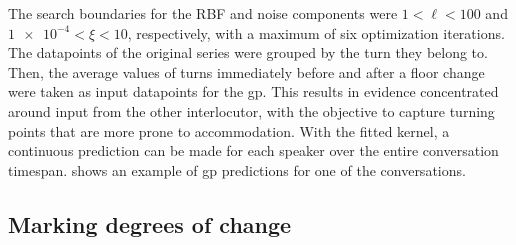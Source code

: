 The search boundaries for the RBF and noise components were $1 < \ell < 100$ and $\num{1e-4} < \xi < 10$, respectively, with a maximum of six optimization iterations.
The datapoints of the original series were grouped by the turn they belong to.
Then, the average values of turns immediately before and after a floor change were taken as input datapoints for the \ac{gp}.
This results in evidence concentrated around input from the other interlocutor, with the objective to capture turning points that are more prone to accommodation.
With the fitted kernel, a continuous prediction can be made for each speaker over the entire conversation timespan.
 shows an example of \ac{gp} predictions for one of the conversations.

\subsection{Marking degrees of change}
\label{subsec:measuring_changes}


